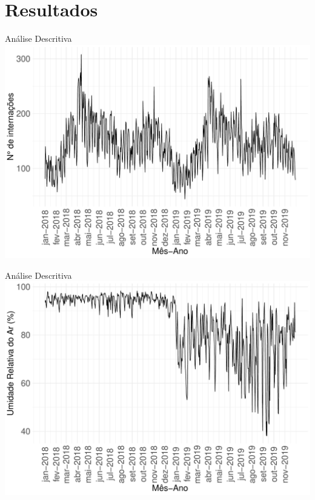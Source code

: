 \documentclass[
  ignorenonframetext,
]{beamer}
\begin{document}
\section{Resultados}\label{resultados}

\begin{frame}{Análise Descritiva}
\label{anuxe1lise-descritiva}
\includegraphics[width=1\textwidth,height=\textheight]{apresentacao_files/figure-beamer/unnamed-chunk-8-1.pdf}
\end{frame}

\begin{frame}{Análise Descritiva}
\label{anuxe1lise-descritiva-1}
\includegraphics[width=1\textwidth,height=\textheight]{apresentacao_files/figure-beamer/unnamed-chunk-9-1.pdf}
\end{frame}
\end{document}
